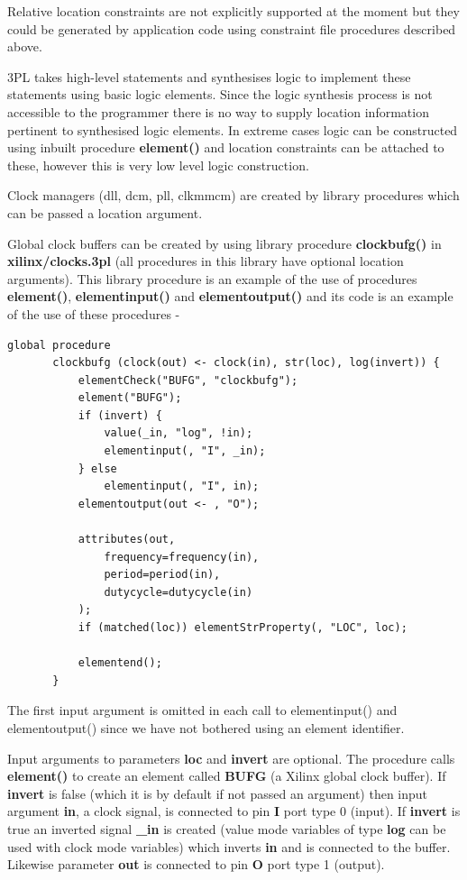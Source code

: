     Relative location constraints are not explicitly supported at the moment but
    they could be generated by application code using constraint file
    procedures described above.
    
    3PL takes high-level statements and synthesises logic to implement these
    statements using basic logic elements. Since the logic synthesis process
    is not accessible to the programmer there is no way to supply location
    information pertinent to synthesised logic elements. In extreme cases
    logic can be constructed using inbuilt procedure {\bf element()} and
    location constraints can be attached to these, however this is very low level
    logic construction.
    
    Clock managers (dll, dcm, pll, clkmmcm) are created by library procedures which
    can be passed a location argument.
    
    Global clock buffers can be created by using library procedure {\bf
    clockbufg()} in {\bf xilinx/clocks.3pl} (all procedures in this library
    have optional location arguments). This library procedure is an example of the
    use of procedures {\bf element()}, {\bf elementinput()} and {\bf elementoutput()} and its code is
    an example of the use of these procedures -

    \begin{lstlisting}[gobble=4, language=threepl]
       global procedure
       clockbufg (clock(out) <- clock(in), str(loc), log(invert)) {
           elementCheck("BUFG", "clockbufg");
           element("BUFG");
           if (invert) {
               value(_in, "log", !in);
               elementinput(, "I", _in);
           } else
               elementinput(, "I", in);
           elementoutput(out <- , "O");

           attributes(out,
               frequency=frequency(in),
               period=period(in),
               dutycycle=dutycycle(in)
           );
           if (matched(loc)) elementStrProperty(, "LOC", loc);

           elementend();
       }
    \end{lstlisting}
    The first input argument is omitted in each call to elementinput()  and
    elementoutput() since we have not bothered using an element identifier.    
   
    Input arguments to parameters {\bf loc} and {\bf invert} are optional. The
    procedure calls {\bf element()} to create an element called {\bf BUFG} (a
    Xilinx global clock buffer). If {\bf invert} is false (which it is by default
    if not passed an argument) then input argument {\bf in}, a clock signal, is
    connected to pin {\bf I} port type 0 (input). If {\bf invert} is true an
    inverted signal {\bf \_in} is created (value mode variables of type {\bf log}
    can be used with clock mode variables) which inverts {\bf in} and is connected
    to the buffer. Likewise parameter {\bf out} is connected to pin
    {\bf O} port type 1 (output).
    
